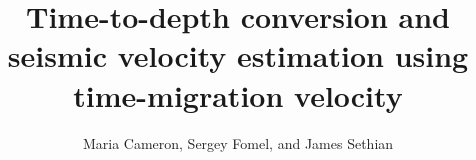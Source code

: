 \title{Time-to-depth conversion and seismic velocity estimation using time-migration velocity}

\renewcommand{\thefootnote}{\fnsymbol{footnote}} 


\address{
\footnotemark[1]Department of Mathematics, \\
Courant Institute of Mathematical Science, \\
New York University,\\
251 Mercer Street, New York, NY 10012 \\
\footnotemark[2]Bureau of Economic Geology, \\
John A. and Katherine G. Jackson School of Geosciences \\
The University of Texas at Austin \\
University Station, Box X \\
Austin, TX 78713-8972 \\
\footnotemark[3]Department of Mathematics, \\
University of California, Berkeley, \\
Berkeley, CA, 94720}
\author{Maria Cameron\footnotemark[1], Sergey Fomel\footnotemark[2], and James Sethian\footnotemark[3]}


\maketitle

\newpagev

